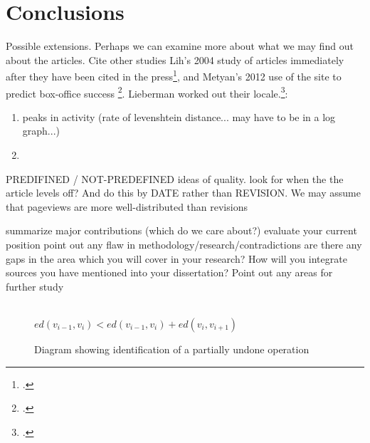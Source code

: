 \documentclass[a4paper,11pt,twoside,notitlepage]{article}
\renewcommand{\cite}[1]{\footcite{#1}}
\begin{document}
        \section{Conclusions}
        Possible extensions.  Perhaps we can examine more about what
        we may find out about the articles. Cite other studies Lih's
        2004 study of articles immediately after they have been cited
        in the press\cite{Lih2004}, and Metyan's 2012 use of the site
        to predict box-office success \cite{Mestyan2012}. Lieberman
        worked out their locale.\cite{Lieberman2009}:

        \begin{enumerate}
          \item peaks in activity (rate of levenshtein distance... may
            have to be in a log graph...)
          \item 
        \end{enumerate}

        PREDIFINED / NOT-PREDEFINED ideas of quality. look for when
        the the article levels off? And do this by DATE rather than
        REVISION. We may assume that pageviews are more
        well-distributed than revisions

        summarize major contributions (which do we care about?)
        evaluate your current position point out any flaw in
        methodology/research/contradictions are there any gaps in the
        area which you will cover in your research?  How will you
        integrate sources you have mentioned into your dissertation?
        Point out any areas for further study

        \begin{figure}[h!]
          \centering
          \\$ed(v_{i-1},v_i) < ed(v_{i-1},v_i) + ed(v_{i},v_{i+1})$
          \caption{Diagram showing identification of a partially
            undone operation}
          \label{fig:part-undo}
        \end{figure}
\end{document}
